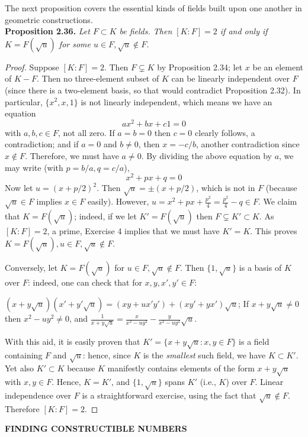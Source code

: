 \documentclass[leqno]{book}
\begin{document}
The next proposition covers the essential kinds of fields built upon one another in geometric constructions.\\

\noindent\textbf{Proposition 2.36.} \emph{Let $F\subset K$ be fields.  Then $[K:F]=2$ if and only if $K=F(\sqrt u)$ for some $u\in F,\sqrt u\notin F$.}
\begin{proof}
Suppose $[K:F]=2$.  Then $F\subsetneq K$ by Proposition 2.34; let $x$ be an element of $K-F$.  Then no three-element subset of $K$ can be linearly independent over $F$ (since there is a two-element basis, so that would contradict Proposition 2.32).  In particular, $\{x^2,x,1\}$ is not linearly independent, which means we have an equation
$$ax^2+bx+c1=0$$
with $a,b,c\in F$, not all zero.  If $a=b=0$ then $c=0$ clearly follows, a contradiction; and if $a=0$ and $b\ne 0$, then $x=-c/b$, another contradiction since $x\notin F$.  Therefore, we must have $a\ne 0$.  By dividing the above equation by $a$, we may write (with $p=b/a,q=c/a$),
$$x^2+px+q=0$$
Now let $u=(x+p/2)^2$.  Then $\sqrt u=\pm(x+p/2)$, which is not in $F$ (because $\sqrt u\in F$ implies $x\in F$ easily).  However, $u=x^2+px+\frac{p^2}4=\frac{p^2}4-q\in F$.  We claim that $K=F(\sqrt u)$; indeed, if we let $K'=F(\sqrt u)$ then $F\subsetneq K'\subset K$.  As $[K:F]=2$, a prime, Exercise 4 implies that we must have $K'=K$.  This proves $K=F(\sqrt u),u\in F,\sqrt u\notin F$.

Conversely, let $K=F(\sqrt u)$ for $u\in F,\sqrt u\notin F$.  Then $\{1,\sqrt u\}$ is a basis of $K$ over $F$: indeed, one can check that for $x,y,x',y'\in F$:
\begin{center}
$(x+y\sqrt u)(x'+y'\sqrt u)=(xy+ux'y')+(xy'+yx')\sqrt u$;
If $x+y\sqrt u\ne 0$ then $x^2-uy^2\ne 0$, and $\frac 1{x+y\sqrt u}=\frac x{x^2-uy^2}-\frac y{x^2-uy^2}\sqrt u$.
\end{center}
With this aid, it is easily proven that $K'=\{x+y\sqrt u:x,y\in F\}$ is a field containing $F$ and $\sqrt u$: hence, since $K$ is the \emph{smallest} such field, we have $K\subset K'$.  Yet also $K'\subset K$ because $K$ manifestly contains elements of the form $x+y\sqrt u$ with $x,y\in F$.  Hence, $K=K'$, and $\{1,\sqrt u\}$ spans $K'$ (i.e., $K$) over $F$.  Linear independence over $F$ is a straightforward exercise, using the fact that $\sqrt u\notin F$.  Therefore $[K:F]=2$.
\end{proof}

\noindent\textbf{FINDING CONSTRUCTIBLE NUMBERS}\\
\end{document}
